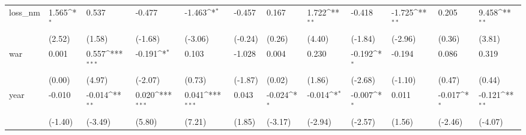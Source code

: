 \def\sym#1{\ifmmode^{#1}\else\(^{#1}\)\fi}
\begin{tabular}{p{1.5cm} p{2cm} p{1.7cm} p{1.7cm} p{1.7cm} p{1.7cm} p{1.7cm} p{1.7cm} p{1.7cm} p{1.7cm} p{1.7cm} p{1.7cm}}
\hline
loss\_nm         &    1.565\sym{*}  &    0.537         &   -0.477         &   -1.463\sym{*}  &   -0.457         &    0.167         &    1.722\sym{**} &   -0.418         &   -1.725\sym{**} &    0.205         &    9.458\sym{**} \\
                &   (2.52)         &   (1.58)         &  (-1.68)         &  (-3.06)         &  (-0.24)         &   (0.26)         &   (4.40)         &  (-1.84)         &  (-2.96)         &   (0.36)         &   (3.81)         \\
war             &    0.001         &    0.557\sym{***}&   -0.191\sym{*}  &    0.103         &   -1.028         &    0.004         &    0.230         &   -0.192\sym{*}  &   -0.194         &    0.086         &    0.319         \\
                &   (0.00)         &   (4.97)         &  (-2.07)         &   (0.73)         &  (-1.87)         &   (0.02)         &   (1.86)         &  (-2.68)         &  (-1.10)         &   (0.47)         &   (0.44)         \\
year            &   -0.010         &   -0.014\sym{**} &    0.020\sym{***}&    0.041\sym{***}&    0.043         &   -0.024\sym{*}  &   -0.014\sym{*}  &   -0.007\sym{*}  &    0.011         &   -0.017\sym{*}  &   -0.121\sym{**} \\
                &  (-1.40)         &  (-3.49)         &   (5.80)         &   (7.21)         &   (1.85)         &  (-3.17)         &  (-2.94)         &  (-2.57)         &   (1.56)         &  (-2.46)         &  (-4.07)         \\
\end{tabular}
\def\sym#1{\ifmmode^{#1}\else\(^{#1}\)\fi}
